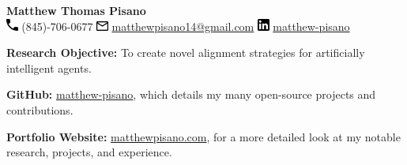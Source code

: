 \documentclass[11pt]{article}
\title{}
\author{\textbf{\LARGE Matthew Thomas Pisano}}
\date{}
\begin{document}
\pagestyle{plain}

\begin{tcolorbox}[width=\linewidth, sharp corners=all, colback=white!90!green, colframe=black]
    
    \begin{center}
        \textbf{\LARGE Matthew Thomas Pisano}\\
        \vspace{0.1in}
        \includegraphics[width=11pt,trim=0 0.4in 0 0]{images/phone.png}
        (845)-706-0677 \hspace*{0.3in}
        \includegraphics[width=11pt,trim=0 0.4in 0 0]{images/mail.png}
        \href{mailto:matthewpisano14@gmail.com}{matthewpisano14@gmail.com} \hspace*{0.5in}
        \includegraphics[width=11pt,trim=0 0.4in 0 0]{images/linkedin.png}
        \href{https://www.linkedin.com/in/matthew-pisano/}{matthew-pisano}
    \end{center}
    
\end{tcolorbox}

\vspace{0.1in}

\hspace*{-0.3in}
\textbf{Research Objective:} To create novel alignment strategies for artificially intelligent agents.

\vspace{0.1in}

\hspace*{-0.3in}
\textbf{GitHub:} \href{https://github.com/matthew-pisano}{matthew-pisano}, which details my many open-source projects and contributions.

\hspace*{-0.3in}
\textbf{Portfolio Website:} \href{https://matthewpisano.com}{matthewpisano.com}, for a more detailed look at my notable research, projects, and experience.
\end{document}
